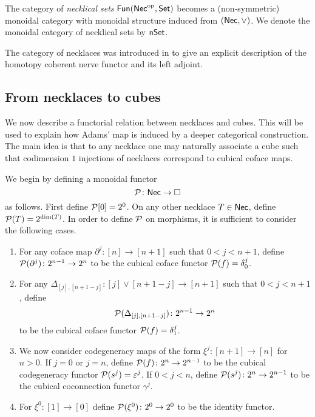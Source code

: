 The category of \textit{necklical sets} $\mathsf{Fun}(\mathsf{Nec}^{\mathrm{op}}, \mathsf{Set})$ becomes a (non-symmetric) monoidal category with monoidal structure induced from $(\mathsf{Nec}, \vee)$.
We denote the monoidal category of necklical sets by $\mathsf{nSet}$.

\begin{remark*}
	The category of necklaces was introduced in \cite{dugger2011rigidification} to give an explicit description of the homotopy coherent nerve functor and its left adjoint.
\end{remark*}

\subsection{From necklaces to cubes}

We now describe a functorial relation between necklaces and cubes.
This will be used to explain how Adams' map is induced by a deeper categorical construction.
The main idea is that to any necklace one may naturally associate a cube such that codimension $1$ injections of necklaces correspond to cubical coface maps.

We begin by defining a monoidal functor
\[
\mathcal{P} \colon \mathsf{Nec} \to \square
\]
as follows.
First define $\mathcal{P}[0] = 2^0$.
On any other necklace $T \in \mathsf{Nec}$, define $\mathcal{P}(T) = 2^{\dim(T)}$.
In order to define $\mathcal{P}$ on morphisms, it is sufficient to consider the following cases.
\begin{enumerate}
	\item For any coface map $\partial^j \colon [n] \to [n+1]$ such that $0< j<{n+1}$, define $\mathcal{P}(\partial^j) \colon 2^{n-1}\to 2^{n}$ to be the cubical coface functor $\mathcal{P}(f)= \delta_0^{j}$.

	\item For any $\Delta_{[j], [n+1-j]} \colon [j] \vee [n+1-j] \to [n+1]$ such that $0<j<n+1$, define
	\[
	\mathcal{P}(\Delta_{[j], [n+1-j]}) \colon 2^{n-1}\to 2^{n}
	\]
	to be the cubical coface functor $\mathcal{P}(f)=\delta_1^{j}$.

	\item We now consider codegeneracy maps of the form $\xi^j \colon [n+1] \to [n]$ for $n>0$.
	If $j=0$ or $j=n$, define $\mathcal{P}(f) \colon 2^n \to 2^{n-1}$ to be the cubical codegeneracy functor $\mathcal{P}(s^j)= \varepsilon^{j}$.
	If $0<j<n$, define $\mathcal{P}(s^j) \colon 2^n \to 2^{n-1}$ to be the cubical coconnection functor $\gamma^{j}$.

	\item For $\xi^0 \colon [1] \to [0]$ define $\mathcal{P}(\xi^0) \colon 2^0 \to 2^0$ to be the identity functor.
\end{enumerate}

